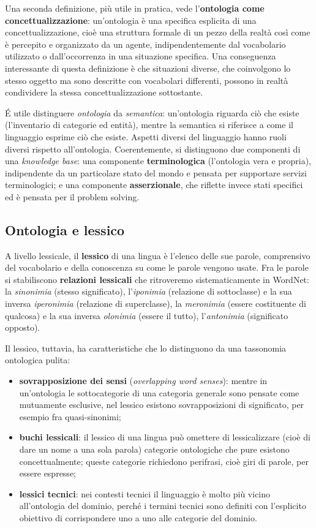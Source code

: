 \documentclass[11pt,a4paper]{report}
\begin{document}
Una seconda definizione, più utile in pratica, vede l'\textbf{ontologia come concettualizzazione}: un'ontologia è una specifica esplicita di una concettualizzazione, cioè una struttura formale di un pezzo della realtà così come è percepito e organizzato da un agente, indipendentemente dal vocabolario utilizzato o dall'occorrenza in una situazione specifica. Una conseguenza interessante di questa definizione è che situazioni diverse, che coinvolgono lo stesso oggetto ma sono descritte con vocabolari differenti, possono in realtà condividere la stessa concettualizzazione sottostante.

\'E utile distinguere \emph{ontologia} da \emph{semantica}: un'ontologia riguarda ciò che esiste (l'inventario di categorie ed entità), mentre la semantica si riferisce a come il linguaggio esprime ciò che esiste. Aspetti diversi del linguaggio hanno ruoli diversi rispetto all'ontologia. Coerentemente, si distinguono due componenti di una \emph{knowledge base}: una componente \textbf{terminologica} (l'ontologia vera e propria), indipendente da un particolare stato del mondo e pensata per supportare servizi terminologici; e una componente \textbf{asserzionale}, che riflette invece stati specifici ed è pensata per il problem solving.

\subsection{Ontologia e lessico}

A livello lessicale, il \textbf{lessico} di una lingua è l'elenco delle sue parole, comprensivo del vocabolario e della conoscenza su come le parole vengono usate. Fra le parole si stabiliscono \textbf{relazioni lessicali} che ritroveremo sistematicamente in WordNet: la \emph{sinonimia} (stesso significato), l'\emph{iponimia} (relazione di sottoclasse) e la sua inversa \emph{iperonimia} (relazione di superclasse), la \emph{meronimia} (essere costituente di qualcosa) e la sua inversa \emph{olonimia} (essere il tutto), l'\emph{antonimia} (significato opposto).

Il lessico, tuttavia, ha caratteristiche che lo distinguono da una tassonomia ontologica pulita:
\begin{itemize}
  \item \textbf{sovrapposizione dei sensi} (\emph{overlapping word senses}): mentre in un'ontologia le sottocategorie di una categoria generale sono pensate come mutuamente esclusive, nel lessico esistono sovrapposizioni di significato, per esempio fra quasi-sinonimi;
  \item \textbf{buchi lessicali}: il lessico di una lingua può omettere di lessicalizzare (cioè di dare un nome a una sola parola) categorie ontologiche che pure esistono concettualmente; queste categorie richiedono perifrasi, cioè giri di parole, per essere espresse;
  \item \textbf{lessici tecnici}: nei contesti tecnici il linguaggio è molto più vicino all'ontologia del dominio, perché i termini tecnici sono definiti con l'esplicito obiettivo di corrispondere uno a uno alle categorie del dominio.
\end{itemize}
\end{document}
